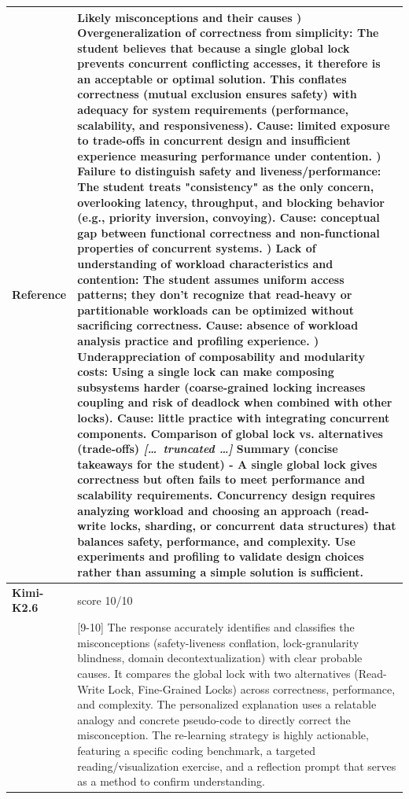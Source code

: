 \begin{longtable}{@{}l p{12.5cm}@{}}
  \textbf{Reference} & Likely misconceptions and their causes \newline 1) Overgeneralization of correctness from simplicity: The student believes that because a single global lock prevents concurrent conflicting accesses, it therefore is an acceptable or optimal solution. This conflates correctness (mutual exclusion ensures safety) with adequacy for system requirements (performance, scalability, and responsiveness). Cause: limited exposure to trade-offs in concurrent design and insufficient experience measuring performance under contention. \newline 2) Failure to distinguish safety and liveness/performance: The student treats "consistency" as the only concern, overlooking latency, throughput, and blocking behavior (e.g., priority inversion, convoying). Cause: conceptual gap between functional correctness and non-functional properties of concurrent systems. \newline 3) Lack of understanding of workload characteristics and contention: The student assumes uniform access patterns; they don't recognize that read-heavy or partitionable workloads can be optimized without sacrificing correctness. Cause: absence of workload analysis practice and profiling experience. \newline 4) Underappreciation of composability and modularity costs: Using a single lock can make composing subsystems harder (coarse-grained locking increases coupling and risk of deadlock when combined with other locks). Cause: little practice with integrating concurrent components. \newline Comparison of global lock vs. alternatives (trade-offs) \newline \textit{[\ldots\ truncated \ldots]} \newline Summary (concise takeaways for the student) \newline - A single global lock gives correctness but often fails to meet performance and scalability requirements. Concurrency design requires analyzing workload and choosing an approach (read-write locks, sharding, or concurrent data structures) that balances safety, performance, and complexity. Use experiments and profiling to validate design choices rather than assuming a simple solution is sufficient. \\
  \midrule
  \textbf{Kimi-K2.6} & score 10/10 \\
  & [9-10] The response accurately identifies and classifies the misconceptions (safety-liveness conflation, lock-granularity blindness, domain decontextualization) with clear probable causes. It compares the global lock with two alternatives (Read-Write Lock, Fine-Grained Locks) across correctness, performance, and complexity. The personalized explanation uses a relatable analogy and concrete pseudo-code to directly correct the misconception. The re-learning strategy is highly actionable, featuring a specific coding benchmark, a targeted reading/visualization exercise, and a reflection prompt that serves as a method to confirm understanding. \\

\end{longtable}
